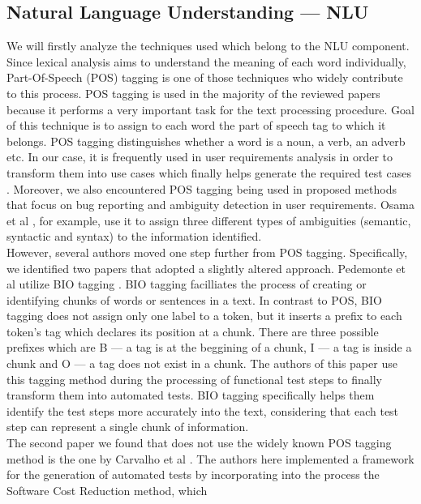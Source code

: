 \subsection{Natural Language Understanding --- NLU}
We will firstly analyze the techniques used which belong to the NLU component.
Since lexical analysis aims to understand the meaning of each word individually, Part-Of-Speech (POS) tagging is one of those techniques who widely 
contribute to this process. POS tagging is used in the majority of the reviewed papers because it performs a very important task for the text processing 
procedure. Goal of this technique is to assign to each word the part of speech tag to which it belongs. POS tagging distinguishes whether a word is 
a noun, a verb, an adverb etc. In our case, it is frequently used in user requirements analysis in order to transform them into use cases which finally 
helps generate the required test cases \cite{allala2019towards, wang2020automatic, rane2017automatic, 8812070, preeti2017building, mulla2020potent}. 
Moreover, we also encountered POS tagging being used in proposed methods that focus on bug reporting and ambiguity detection in user requirements. 
Osama et al \cite{9240680}, for example, use it to assign three different types of ambiguities (semantic, syntactic and syntax) to the information identified. \\
However, several authors moved one step further from POS tagging. Specifically, we identified two papers that adopted a slightly altered approach. 
Pedemonte et al \cite{pedemonte2012towards} utilize BIO tagging \cite{ramshaw1999text}. BIO tagging facilliates the process of creating or identifying chunks of words or sentences in a text. 
In contrast to POS, BIO tagging does not assign only one label to a token, but it inserts a prefix to each token's tag which declares its position 
at a chunk. There are three possible prefixes which are B --- a tag is at the beggining of a chunk, I --- a tag is inside a chunk and O --- 
a tag does not exist in a chunk. The authors of this paper use this tagging method during the processing of functional test steps to finally transform them into 
automated tests. BIO tagging specifically helps them identify the test steps more accurately into the text, considering that each test step can 
represent a single chunk of information.\\
The second paper we found that does not use the widely known POS tagging method is the one by Carvalho et al \cite{carvalho2014nat2testscr}. The 
authors here implemented a framework for the generation of automated tests by incorporating into the process the Software Cost Reduction method, which 
